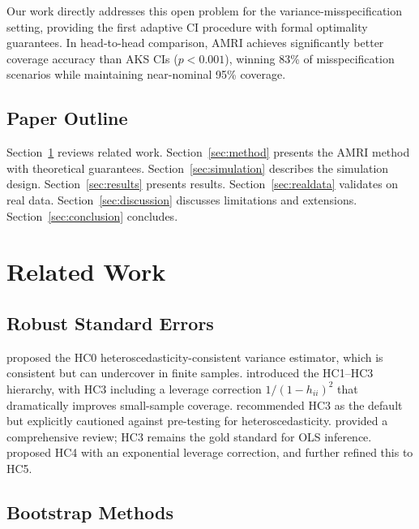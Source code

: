 \documentclass[12pt]{article}
\theoremstyle{definition}
\theoremstyle{remark}
\begin{document}
Our work directly addresses this open problem for the variance-misspecification setting, providing the first adaptive CI procedure with formal optimality guarantees. In head-to-head comparison, AMRI achieves significantly better coverage accuracy than AKS CIs ($p < 0.001$), winning 83\% of misspecification scenarios while maintaining near-nominal 95\% coverage.

\subsection{Paper Outline}

Section~\ref{sec:related} reviews related work. Section~\ref{sec:method} presents the AMRI method with theoretical guarantees. Section~\ref{sec:simulation} describes the simulation design. Section~\ref{sec:results} presents results. Section~\ref{sec:realdata} validates on real data. Section~\ref{sec:discussion} discusses limitations and extensions. Section~\ref{sec:conclusion} concludes.


\section{Related Work}\label{sec:related}

\subsection{Robust Standard Errors}

\citet{white1980heteroskedasticity} proposed the HC0 heteroscedasticity-consistent variance estimator, which is consistent but can undercover in finite samples. \citet{mackinnon1985some} introduced the HC1--HC3 hierarchy, with HC3 including a leverage correction $1/(1-h_{ii})^2$ that dramatically improves small-sample coverage. \citet{long2000using} recommended HC3 as the default but explicitly cautioned against pre-testing for heteroscedasticity. \citet{mackinnon2012thirty} provided a comprehensive review; HC3 remains the gold standard for OLS inference. \citet{cribari2004asymptotic} proposed HC4 with an exponential leverage correction, and \citet{cribari2011new} further refined this to HC5.

\subsection{Bootstrap Methods}
\end{document}

